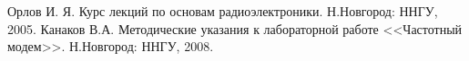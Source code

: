 \documentclass[a4paper,12pt]{article}
\begin{document}
\begin{thebibliography}{99}
 Орлов И. Я. Курс лекций по основам радиоэлектроники. Н.Новгород: ННГУ, 2005.
 Канаков В.А. Методические указания к лабораторной работе <<Частотный модем>>. Н.Новгород: ННГУ, 2008.
\end{thebibliography}
\end{document}
